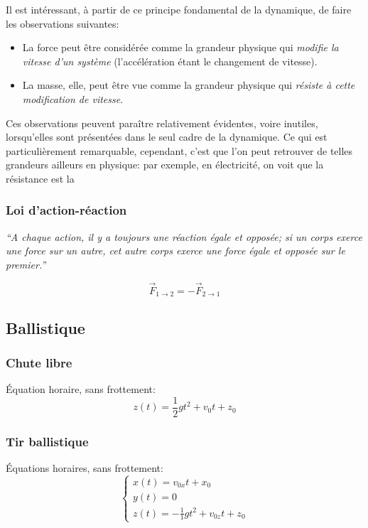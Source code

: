 \documentclass{article}
\numberwithin{equation}{section}
\begin{document}
Il est intéressant, à partir de ce principe fondamental de la dynamique, de faire les observations suivantes:
\begin{itemize}
	\item La force peut être considérée comme la grandeur physique qui \emph{modifie la vitesse d'un système} (l'accélération étant le changement de vitesse).
	\item La masse, elle, peut être vue comme la grandeur physique qui \emph{résiste à cette modification de vitesse}.
\end{itemize}
Ces observations peuvent paraître relativement évidentes, voire inutiles, lorsqu'elles sont présentées dans le seul cadre de la dynamique. Ce qui est particulièrement remarquable, cependant, c'est que l'on peut retrouver de telles grandeurs ailleurs en physique: par exemple, en électricité, on voit que la résistance est la 

\subsubsection{Loi d'action-réaction} \label{sec:actionreaction}
\begin{center}
	\emph{``A chaque action, il y a toujours une réaction égale et opposée; si un corps exerce une force sur un autre, cet autre corps exerce une force égale et opposée sur le premier.''}
\end{center}
\begin{equation}
	\boxed{\vec F_{1 \to 2} = - \vec F_{2 \to 1}}
\end{equation}

\subsection{Ballistique}
\subsubsection{Chute libre}
Équation horaire, sans frottement:
\begin{equation}
	\boxed{z(t) = \frac{1}{2} gt^2 + v_0t + z_0}
\end{equation}

\subsubsection{Tir ballistique}
Équations horaires, sans frottement:
\begin{equation}
	\boxed{\begin{cases}
		x(t) = v_{0x}t + x_0 \\
		y(t) = 0 \\
		z(t) = -\frac{1}{1}gt^2 + v_{0z}t + z_0
	\end{cases}}
\end{equation}
\end{document}
